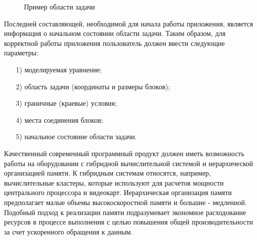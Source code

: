 \documentclass[a4paper, 14pt]{extarticle}
\theoremstyle{definition}
\begin{document}
\begin{figure}[h]
	\caption{Пример области задачи}
	\label{ris:2Block_ex}
\end{figure}

\par Последней составляющей, необходимой для начала работы приложения, является информация о начальном состоянии области задачи. Таким образом, для корректной работы приложения пользователь должен ввести следующие параметры:
\begin{enumerate}
\item[1)] моделируемая уравнение;
\item[2)] область задачи (координаты и размеры блоков);
\item[3)] граничные (краевые) условия;
\item[4)] места соединения блоков;
\item[5)] начальное состояние области задачи.
\end{enumerate}

\par Качественный современный программный продукт должен иметь возможность работы на оборудовании с гибридной вычислительной системой и иерархической организацией памяти. К гибридным системам относятся, например, вычислительные кластеры, которые используют для расчетов мощности центрального процессора и видеокарт. Иерархическая организация памяти предполагает малые объемы высокоскоростной памяти и большие - медленной. Подобный подход к реализации памяти подразумевает экономное расходование ресурсов в процессе выполнения с целью повышения общей производительности за счет ускоренного обращения к данным.
\end{document}
